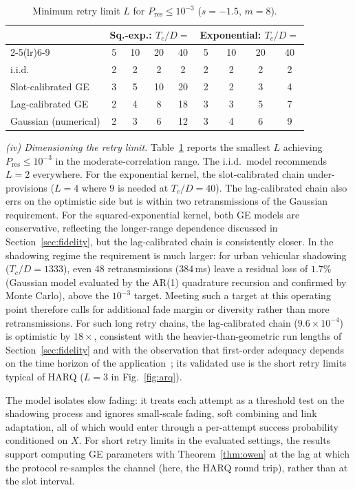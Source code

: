 \documentclass[conference]{IEEEtran}
\newcommand{\pres}{P_{\mathrm{res}}}
\begin{document}
\begin{table}[t]
\centering
\caption{Minimum retry limit $L$ for $\pres\le 10^{-3}$ ($s=-1.5$, $m=8$).}\label{tab:K}
\footnotesize
\setlength{\tabcolsep}{4pt}
\begin{tabular}{@{}lcccc@{\hskip 8pt}cccc@{}}
\toprule
 & \multicolumn{4}{c}{Sq.-exp.: $T_c/D=$} & \multicolumn{4}{c}{Exponential: $T_c/D=$}\\
\cmidrule(lr){2-5}\cmidrule(lr){6-9}
 & 5 & 10 & 20 & 40 & 5 & 10 & 20 & 40\\
\midrule
i.i.d. & 2 & 2 & 2 & 2 & 2 & 2 & 2 & 2\\
Slot-calibrated GE & 3 & 5 & 10 & 20 & 2 & 2 & 3 & 4\\
Lag-calibrated GE & 2 & 4 & 8 & 18 & 3 & 3 & 5 & 7\\
Gaussian (numerical) & 2 & 3 & 6 & 12 & 3 & 4 & 6 & 9\\
\bottomrule
\end{tabular}
\end{table}

\emph{(iv) Dimensioning the retry limit.} Table~\ref{tab:K} reports the smallest $L$ achieving $\pres\le10^{-3}$ in the moderate-correlation range. The i.i.d.\ model recommends $L=2$ everywhere. For the exponential kernel, the slot-calibrated chain under-provisions ($L=4$ where $9$ is needed at $T_c/D=40$). The lag-calibrated chain also errs on the optimistic side but is within two retransmissions of the Gaussian requirement. For the squared-exponential kernel, both GE models are conservative, reflecting the longer-range dependence discussed in Section~\ref{sec:fidelity}, but the lag-calibrated chain is consistently closer. In the shadowing regime the requirement is much larger: for urban vehicular shadowing ($T_c/D=1333$), even 48 retransmissions ($384$\,ms) leave a residual loss of $1.7\%$ (Gaussian model evaluated by the AR(1) quadrature recursion and confirmed by Monte Carlo), above the $10^{-3}$ target. Meeting such a target at this operating point therefore calls for additional fade margin or diversity rather than more retransmissions. For such long retry chains, the lag-calibrated chain ($9.6\times10^{-4}$) is optimistic by $18\times$, consistent with the heavier-than-geometric run lengths of Section~\ref{sec:fidelity} and with the observation that first-order adequacy depends on the time horizon of the application~\cite{tan2000}; its validated use is the short retry limits typical of HARQ ($L=3$ in Fig.~\ref{fig:arq}).

The model isolates slow fading: it treats each attempt as a threshold test on the shadowing process and ignores small-scale fading, soft combining and link adaptation, all of which would enter through a per-attempt success probability conditioned on $X$. For short retry limits in the evaluated settings, the results support computing GE parameters with Theorem~\ref{thm:owen} at the lag at which the protocol re-samples the channel (here, the HARQ round trip), rather than at the slot interval.
\end{document}
